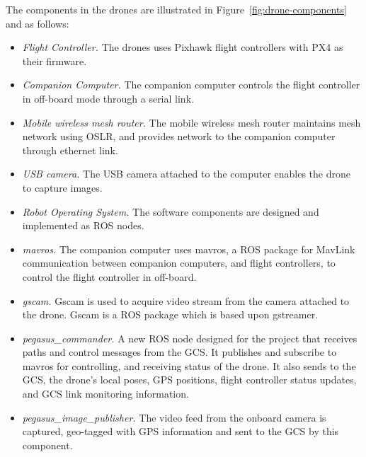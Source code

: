 The components in the drones are illustrated in Figure~\ref{fig:drone-components} and as follows:
\begin{itemize}
	\item \textit{Flight Controller.} The drones uses Pixhawk flight controllers with PX4 as their firmware.
	\item \textit{Companion Computer.} The companion computer controls the flight controller in off-board mode through a serial link.
	\item \textit{Mobile wireless mesh router.} The mobile wireless mesh router maintains mesh network using OSLR, and provides network to the companion computer through ethernet link.
	\item \textit{USB camera.} The USB camera attached to the computer enables the drone to capture images.
	\item \textit{Robot Operating System.} The software components are designed and implemented as ROS nodes.
	\item \textit{mavros.} The companion computer uses mavros, a ROS package for MavLink communication between companion computers, and flight controllers, to control the flight controller in off-board.
	\item \textit{gscam.}  Gscam is used to acquire video stream from the camera attached to the drone. Gscam is a ROS package which is based upon gstreamer.
	\item \textit{pegasus\_commander.} A new ROS node designed for the project that receives paths and control messages from the GCS. It publishes and subscribe to mavros for controlling, and receiving status of the drone. It also sends to the GCS, the drone's local poses, GPS positions, flight controller status updates, and GCS link monitoring information.
	\item \textit{pegasus\_image\_publisher.} The video feed from the onboard camera is captured, geo-tagged with GPS information and sent to the GCS by this component.
\end{itemize}

